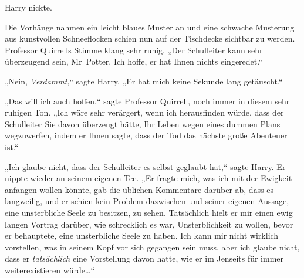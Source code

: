 Harry nickte.

Die Vorhänge nahmen ein leicht blaues Muster an und eine schwache Musterung aus kunstvollen Schneeflocken schien nun auf der Tischdecke sichtbar zu werden. Professor Quirrells Stimme klang sehr ruhig. „Der Schulleiter kann sehr überzeugend sein, Mr~Potter. Ich hoffe, er hat Ihnen nichts eingeredet.“

„Nein, \emph{Verdammt},“ sagte Harry. „Er hat mich keine Sekunde lang getäuscht.“

„Das will ich auch hoffen,“ sagte Professor Quirrell, noch immer in diesem sehr ruhigen Ton. „Ich wäre sehr verärgert, wenn ich herausfinden würde, dass der Schulleiter Sie davon überzeugt hätte, Ihr Leben wegen eines dummen Plans wegzuwerfen, indem er Ihnen sagte, dass der Tod das nächste große Abenteuer ist.“

„Ich glaube nicht, dass der Schulleiter es selbst geglaubt hat,“ sagte Harry. Er nippte wieder an seinem eigenen Tee. „Er fragte mich, was ich mit der Ewigkeit anfangen wollen könnte, gab die üblichen Kommentare darüber ab, dass es langweilig, und er schien kein Problem dazwischen und seiner eigenen Aussage, eine unsterbliche Seele zu besitzen, zu sehen. Tatsächlich hielt er mir einen ewig langen Vortrag darüber, wie schrecklich es war, Unsterblichkeit zu wollen, bevor er behauptete, eine unsterbliche Seele zu haben. Ich kann mir nicht wirklich vorstellen, was in seinem Kopf vor sich gegangen sein muss, aber ich glaube nicht, dass er \emph{tatsächlich} eine Vorstellung davon hatte, wie er im Jenseits für immer weiterexistieren würde…“

